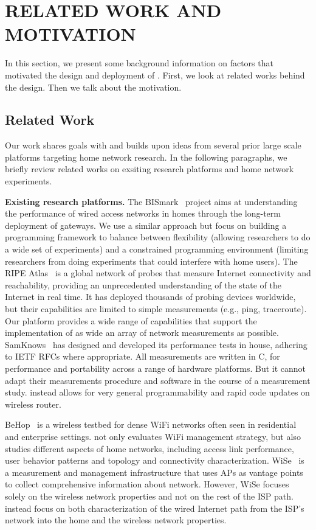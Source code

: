 \chapter{RELATED WORK AND MOTIVATION}
\label{sec.relatedwork_motivation}
In this section, we present some background information on factors that motivated the design and deployment of \sysname. First, we look at related works behind the design. Then we talk about the motivation.
\section{Related Work}
\label{ssec.related_work}
Our work shares goals with and builds upon ideas from several prior large scale platforms targeting home network research. In the following paragraphs, we briefly review related works on exsiting research platforms and home network experiments.  

\textbf{Existing research platforms. }The BISmark~\cite{183951} project aims at understanding the performance of wired access networks in homes through the long-term deployment of gateways. We use a similar approach but focus on building a programming framework to balance between flexibility (allowing researchers to do a wide set of experiments) and a constrained programming environment (limiting researchers from doing experiments that could interfere with home users). The RIPE Atlas~\cite{ripeatlas} is a global network of probes that measure Internet connectivity and reachability, providing an unprecedented understanding of the state of the Internet in real time. It has deployed thousands of probing devices worldwide, but their capabilities are limited to simple measurements (e.g., ping, traceroute). Our platform provides a wide range of capabilities that support the implementation of as wide an array of network measurements as possible. SamKnows~\cite{samknows} has designed and developed its performance tests in house, adhering to IETF RFCs where appropriate. All measurements are written in C, for performance and portability across a range of hardware platforms. But it cannot adapt their measurements procedure and software in the course of a measurement study. \sysname instead allows for very general programmability and rapid code updates on wireless router. 

BeHop~\cite{yiakoumis2014behop} is a wireless testbed for dense WiFi networks often seen in residential and enterprise settings. \sysname not only evaluates WiFi management strategy, but also studies different aspects of home networks, including access link performance, user behavior patterns and topology and connectivity characterization. WiSe~\cite{patro2013observing} is a measurement and management infrastructure that uses APs as vantage points to collect comprehensive information about network. However, WiSe focuses solely on the wireless network properties and not on the rest of the ISP path. \sysname instead focus on both characterization of the wired Internet path from the ISP’s network into the home and the wireless network properties.

